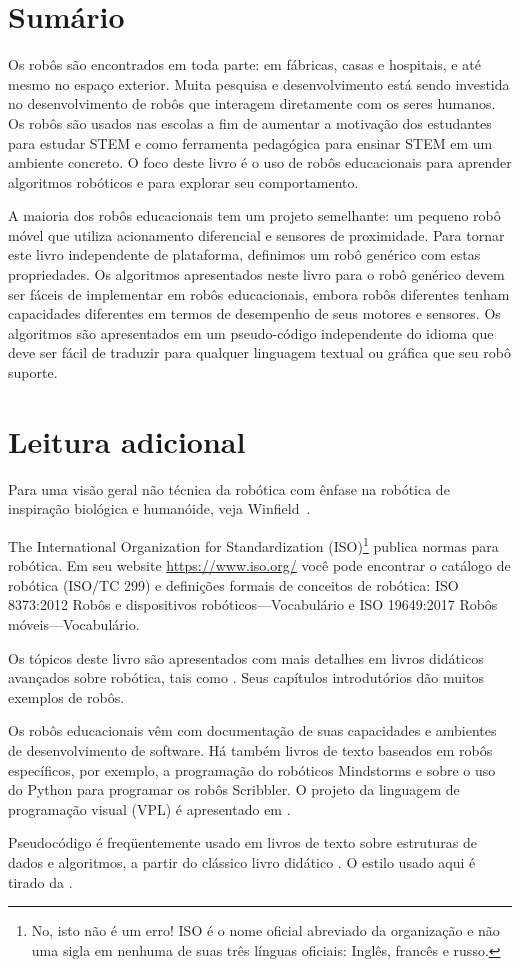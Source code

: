 \section{Sumário}

Os robôs são encontrados em toda parte: em fábricas, casas e hospitais, e até mesmo no espaço exterior. Muita pesquisa e desenvolvimento está sendo investida no desenvolvimento de robôs que interagem diretamente com os seres humanos. Os robôs são usados nas escolas a fim de aumentar a motivação dos estudantes para estudar STEM e como ferramenta pedagógica para ensinar STEM em um ambiente concreto. O foco deste livro é o uso de robôs educacionais para aprender algoritmos robóticos e para explorar seu comportamento.

A maioria dos robôs educacionais tem um projeto semelhante: um pequeno robô móvel que utiliza acionamento diferencial e sensores de proximidade. Para tornar este livro independente de plataforma, definimos um robô genérico com estas propriedades. Os algoritmos apresentados neste livro para o robô genérico devem ser fáceis de implementar em robôs educacionais, embora robôs diferentes tenham capacidades diferentes em termos de desempenho de seus motores e sensores. Os algoritmos são apresentados em um pseudo-código independente do idioma que deve ser fácil de traduzir para qualquer linguagem textual ou gráfica que seu robô suporte.

\section{Leitura adicional}

Para uma visão geral não técnica da robótica com ênfase na robótica de inspiração biológica e humanóide, veja Winfield~\cite{vsi}.

The International Organization for Standardization (ISO)\footnote{No, isto não é um erro! ISO é o nome oficial abreviado da organização e não uma sigla em nenhuma de suas três línguas oficiais: Inglês, francês e russo.} publica normas para robótica. Em seu website \url{https://www.iso.org/} você pode encontrar o catálogo de robótica (ISO/TC 299) e definições formais de conceitos de robótica: ISO 8373:2012 Robôs e dispositivos robóticos---Vocabulário e ISO 19649:2017 Robôs móveis---Vocabulário.

Os tópicos deste livro são apresentados com mais detalhes em livros didáticos avançados sobre robótica, tais como \cite{dudek,siegwart}. Seus capítulos introdutórios dão muitos exemplos de robôs.

Os robôs educacionais vêm com documentação de suas capacidades e ambientes de desenvolvimento de software. Há também livros de texto baseados em robôs específicos, por exemplo, \cite{trobaugh} a programação do \lego{}  robóticos Mindstorms e \cite{kumar} sobre o uso do Python para programar os robôs Scribbler. O projeto da linguagem de programação visual (VPL) é apresentado em \cite{shin2014idc}.

Pseudocódigo é freqüentemente usado em livros de texto sobre estruturas de dados e algoritmos, a partir do clássico livro didático \cite{aho}. O estilo usado aqui é tirado da \cite{pcdp2}.

